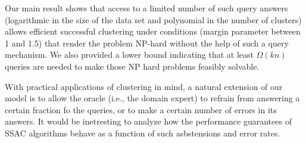 \documentclass{article}
\begin{document}
Our main result shows that access to a limited number of such query answers (logarithmic in the size of the data set and polynomial in the number of clusters) allows efficient successful clustering under conditions (margin parameter between 1 and 1.5) that render the problem NP-hard without the help of such a query mechanism.  
 We also provided a lower bound indicating that at least $\Omega(kn)$ queries are needed to make those NP hard problems feasibly solvable.

With practical applications of clustering in mind, a natural extension of our model is to allow the oracle (i.e., the domain expert) to refrain from answering a certain fraction fo the queries, or to make a certain number of errors in its answers. It would be inetresting to analyze how the performance guarantees of SSAC algorithms behave as a function of such asbstensions and error rates.




\end{document}
